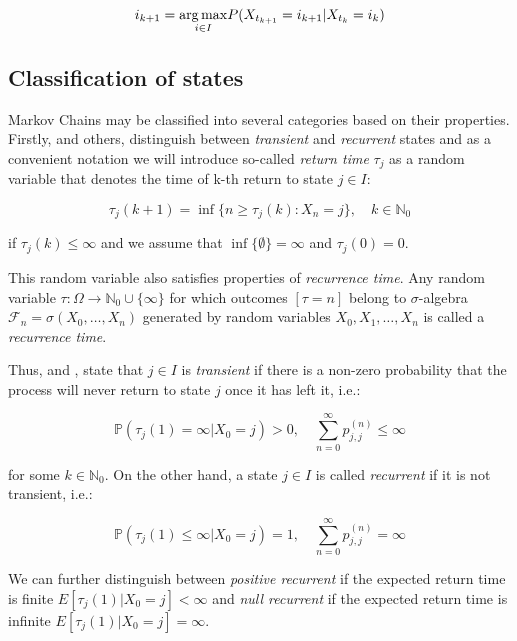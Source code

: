 \begin{equation}
 i_{k+1} = \underset{i \in I}{\arg\max} P(X_{t_{k+1}}=i_{k+1}|X_{t_{k}}=i_{k}) \\
\end{equation} 

\subsection{Classification of states}

Markov Chains may be classified into several categories based on their properties. 
Firstly, \cite{Praskova2012} and others, distinguish between \textit{transient} and \textit{recurrent} states and as a convenient notation we will introduce so-called \textit{return time} $\tau_j$ 
as a random variable that denotes the time of k-th return to state $j \in I$:

\begin{equation}
\tau_j(k+1) = \inf \{n \geq \tau_j(k) : X_n =j\}, \quad k \in \mathbb{N}_0
\end{equation}

if $\tau_j(k) \leq \infty$ and we assume that $\inf\{\emptyset\} = \infty$ and $\tau_j(0) = 0$.

This random variable also satisfies properties of {\it recurrence time}. 
Any random variable $\tau:\Omega \to \mathbb{N}_0 \cup \{ \infty \}$ for which outcomes $[\tau = n]$ belong to 
$\sigma$-algebra $\mathcal{F}_n = \sigma(X_0,\ldots,X_n)$ generated by random variables $X_0,X_1, \ldots , X_n$ is called a {\it recurrence time}.

Thus, \cite{Bremaud1999} and \cite{Tolver2016}, state that $j \in I$ is \textit{transient} if there is a non-zero probability that the process will never return to state $j$ once it has left it, i.e.:

\begin{equation}
    \mathbb{P}(\tau_j(1) = \infty|X_0=j) > 0, \quad \sum\limits_{n=0}^{\infty} p_{j,j}^{(n)} \leq \infty
\end{equation}

for some $k \in \mathbb{N}_0$. On the other hand, a state $j \in I$ is called {\it recurrent} if it is not transient, i.e.:

\begin{equation}
    \mathbb{P}(\tau_j(1) \leq \infty|X_0=j) = 1, \quad \sum\limits_{n=0}^{\infty} p_{j,j}^{(n)} = \infty
\end{equation}

We can further distinguish between {\it positive recurrent} if the expected return time is finite $E[\tau_j(1)|X_0=j] < \infty$ and {\it null recurrent} if the expected return time is infinite $E[\tau_j(1)|X_0=j] = \infty$.

